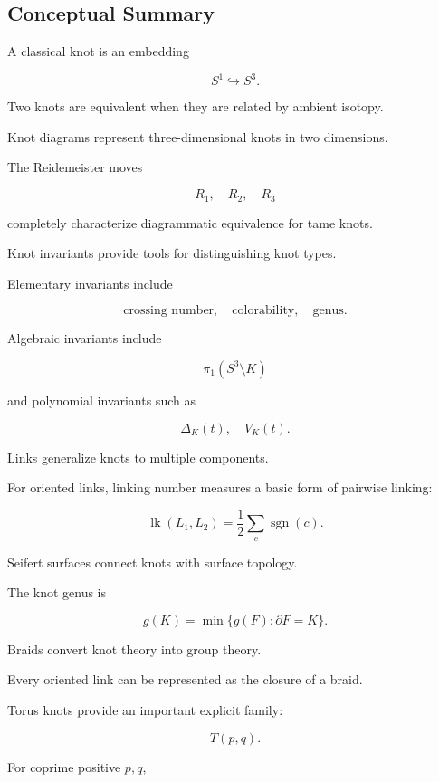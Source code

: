 \subsection{Conceptual Summary}
\label{subsec:knot-theory-summary}

A classical knot is an embedding

\[
\boxed{
S^1\hookrightarrow S^3.
}
\]

Two knots are equivalent when they are related by ambient isotopy.

Knot diagrams represent three-dimensional knots in two dimensions.

The Reidemeister moves

\[
\boxed{
R_1,\quad R_2,\quad R_3
}
\]

completely characterize diagrammatic equivalence for tame knots.

Knot invariants provide tools for distinguishing knot types.

Elementary invariants include

\[
\boxed{
\text{crossing number},
\quad
\text{colorability},
\quad
\text{genus}.
}
\]

Algebraic invariants include

\[
\boxed{
\pi_1(S^3\setminus K)
}
\]

and polynomial invariants such as

\[
\boxed{
\Delta_K(t),
\quad
V_K(t).
}
\]

Links generalize knots to multiple components.

For oriented links, linking number measures a basic form of pairwise
linking:

\[
\boxed{
\operatorname{lk}(L_1,L_2)
=
\frac12
\sum_c\operatorname{sgn}(c).
}
\]

Seifert surfaces connect knots with surface topology.

The knot genus is

\[
\boxed{
g(K)
=
\min\{
g(F):
\partial F=K
\}.
}
\]

Braids convert knot theory into group theory.

Every oriented link can be represented as the closure of a braid.

Torus knots provide an important explicit family:

\[
\boxed{
T(p,q).
}
\]

For coprime positive \(p,q\),

